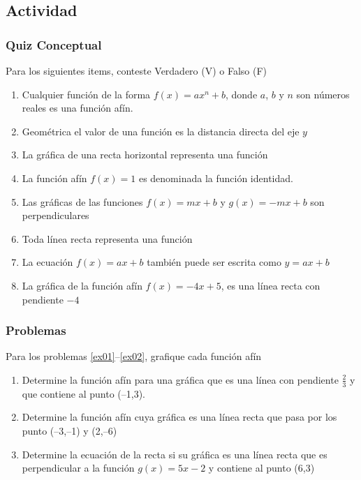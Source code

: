 \documentclass[letterpaper,11pt,twoside]{article}
\begin{document}
\begin{multicols}{2}
 \subsection*{Actividad}
 \subsubsection*{Quiz Conceptual}
 Para los siguientes items, conteste Verdadero (V) o Falso (F)
 \begin{enumerate}
 \item Cualquier función de la forma $f(x)=ax^{n}+b$, donde $a$, $b$ y $n$ son números reales es una función afín.
 \item Geométrica el valor de una función es la distancia directa del eje $y$
 \item La gráfica de una recta horizontal representa una función
 \item La función afín $f(x)=1$ es denominada la función identidad.
 \item Las gráficas de las funciones $f(x)=mx+b$ y $g(x)=-mx+b$ son perpendiculares
 \item Toda línea recta representa una función
 \item La ecuación $f(x)=ax+b$ también puede ser escrita como $y=ax+b$
 \item La gráfica de la función afín $f(x)=-4x+5$, es una línea recta con pendiente $-4$
 \end{enumerate}
 \subsubsection*{Problemas}
 Para los problemas \ref{ex01}--\ref{ex02}, grafique cada función afín
 \begin{enumerate}
Para los problemas \ref{ex03}--\ref{ex04}, determine la ecuación de la recta para las condiciones dadas
\item \label{ex03} Determine la función afín para una gráfica que es una línea con pendiente $\frac{2}{3}$ y que contiene al punto (--1,3).
\item Determine la función afín cuya gráfica es una línea recta que pasa por los punto (--3,--1) y (2,--6)
\item \label{ex04} Determine la ecuación de la recta si su gráfica es una línea recta que es perpendicular a la función $g(x)=5x-2$ y contiene al punto (6,3)


\end{enumerate}
\end{multicols}
\end{document}
